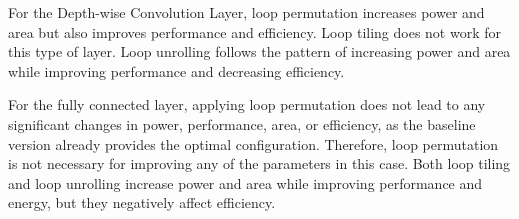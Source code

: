 For the Depth-wise Convolution Layer, loop permutation increases power and area but also improves performance and efficiency. Loop tiling does not work for this type of layer. Loop unrolling follows the pattern of increasing power and area while improving performance and decreasing efficiency.

For the fully connected layer, applying loop permutation does not lead to any significant changes in power, performance, area, or efficiency, as the baseline version already provides the optimal configuration. Therefore, loop permutation is not necessary for improving any of the parameters in this case. Both loop tiling and loop unrolling increase power and area while improving performance and energy, but they negatively affect efficiency.